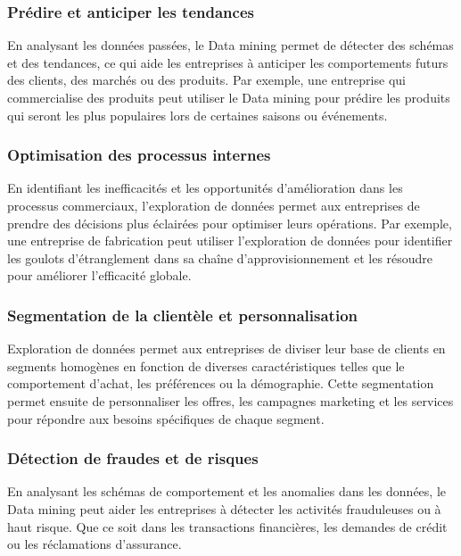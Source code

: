 \documentclass[a4paper,12pt]{article}
\begin{document}
        \subsubsection{Prédire et anticiper les tendances}
            En analysant les données passées, le Data mining permet de détecter des schémas et des tendances, ce qui aide les entreprises à anticiper les comportements futurs des clients, des marchés ou des produits. 
            Par exemple, une entreprise qui commercialise des produits peut utiliser le Data mining pour prédire les produits qui seront les plus populaires lors de certaines saisons ou événements.
        
        \subsubsection{Optimisation des processus internes}
            En identifiant les inefficacités et les opportunités d'amélioration dans les processus commerciaux, l'exploration de données permet aux entreprises de prendre des décisions plus éclairées pour optimiser leurs opérations. 
            Par exemple, une entreprise de fabrication peut utiliser l'exploration de données pour identifier les goulots d'étranglement dans sa chaîne d'approvisionnement et les résoudre pour améliorer l'efficacité globale.

        \subsubsection{Segmentation de la clientèle et personnalisation}
            Exploration de données permet aux entreprises de diviser leur base de clients en segments homogènes en fonction de diverses caractéristiques telles que le comportement d'achat, les préférences ou la démographie. Cette segmentation permet ensuite de personnaliser les offres, les campagnes marketing et les services pour répondre aux besoins spécifiques de chaque segment.

        \subsubsection{Détection de fraudes et de risques}
            En analysant les schémas de comportement et les anomalies dans les données, le Data mining peut aider les entreprises à détecter les activités frauduleuses ou à haut risque. Que ce soit dans les transactions financières, les demandes de crédit ou les réclamations d'assurance.
\end{document}
